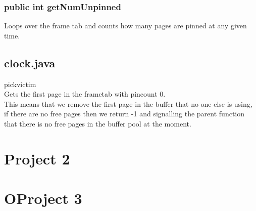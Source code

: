 \documentclass[a4paper,10pt,titlepage]{report}
\begin{document}
\subsubsection{public int getNumUnpinned}

Loops over the frame tab and counts how many pages are pinned at any given time.

\vspace{5mm}
\subsection{clock.java} 
pickvictim \\
Gets the first page in the frametab with pincount 0. \\
This means that we remove the first page in the buffer that no one else is using, if there are no free pages then we return -1 and signalling the parent function that there is no free pages in the buffer pool at the moment.


\section{Project 2}




\section{OProject 3}
\end{document}
